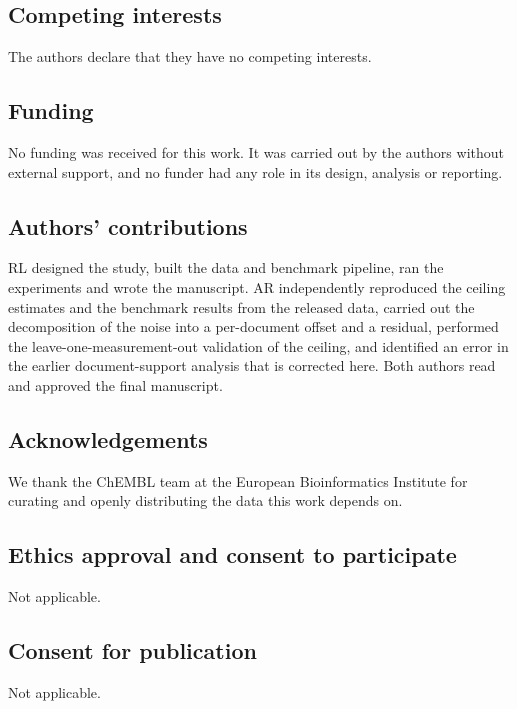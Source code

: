 \subsection*{Competing interests}
The authors declare that they have no competing interests.

\subsection*{Funding}
No funding was received for this work. It was carried out by the authors without external support, and no funder had any role in its design, analysis or reporting.

\subsection*{Authors' contributions}
RL designed the study, built the data and benchmark pipeline, ran the experiments and wrote the manuscript. AR independently reproduced the ceiling estimates and the benchmark results from the released data, carried out the decomposition of the noise into a per-document offset and a residual, performed the leave-one-measurement-out validation of the ceiling, and identified an error in the earlier document-support analysis that is corrected here. Both authors read and approved the final manuscript.

\subsection*{Acknowledgements}
We thank the ChEMBL team at the European Bioinformatics Institute for curating and openly distributing the data this work depends on.

\subsection*{Ethics approval and consent to participate}
Not applicable.

\subsection*{Consent for publication}
Not applicable.
